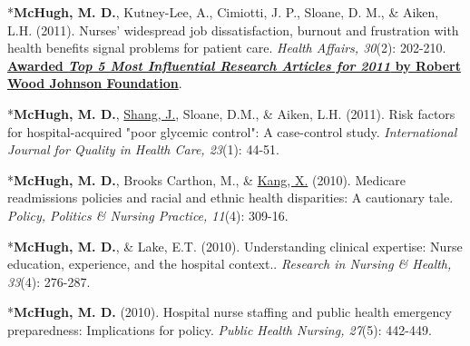 \documentclass[10pt,]{article}
\begin{document}
{{{{{{{{{{{{{{{\begin{hangparas}{.25in}{1}

{*\textbf {McHugh, M. D.}}, Kutney-Lee, A., Cimiotti, J. P., Sloane, D. M., \& Aiken, L.H. (2011). Nurses’ widespread job dissatisfaction, burnout and frustration with health benefits signal problems for patient care. {\textit {Health Affairs, 30}}(2): 202-210. {\textbf {\underline {Awarded {\textit {Top 5 Most Influential Research Articles for 2011}} by Robert Wood Johnson Foundation}}}.

\end{hangparas}

\vspace{4mm}

\begin{hangparas}{.25in}{1}

*{\textbf {McHugh, M. D.}}, {\underline {Shang, J.}}, Sloane, D.M., \& Aiken, L.H. (2011). Risk factors for hospital-acquired "poor glycemic control": A case-control study. {\textit {International Journal for Quality in Health Care, 23}}(1): 44-51.

\end{hangparas}

\vspace{4mm}

\begin{hangparas}{.25in}{1}

*{\textbf {McHugh, M. D.}}, Brooks Carthon, M., \& {\underline {Kang, X.}} (2010). Medicare readmissions policies and racial and ethnic health disparities: A cautionary tale. {\textit {Policy, Politics \& Nursing Practice, 11}}(4): 309-16.

\end{hangparas}

\vspace{4mm}

\begin{hangparas}{.25in}{1}

*{\textbf {McHugh, M. D.}}, \& Lake, E.T. (2010). Understanding clinical expertise: Nurse education, experience, and the hospital context.. {\textit {Research in Nursing \& Health, 33}}(4): 276-287.

\end{hangparas}

\vspace{4mm}

\begin{hangparas}{.25in}{1}

*{\textbf {McHugh, M. D.}} (2010). Hospital nurse staffing and public health emergency preparedness: Implications for policy. {\textit {Public Health Nursing, 27}}(5): 442-449.


\end{hangparas}}}}}}}}}}}}}}}}
\end{document}
